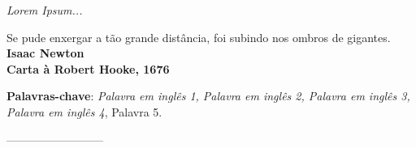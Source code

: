 
\newpage
\vspace*{\fill}
\begin{flushright}
		\textit{Lorem Ipsum...}
\end{flushright}

\begin{agradecimentos}

\lipsum[2-4]

\end{agradecimentos}

\begin{epigrafe}
    \vspace*{\fill}
	\begin{flushright}
		Se pude enxergar a tão grande distância, foi subindo nos ombros de gigantes.\\
		 \vspace{\baselineskip}
		\textbf{Isaac Newton}\\
		\textbf{Carta à Robert Hooke, 1676}
	\end{flushright}
\end{epigrafe}



\setlength{\absparsep}{18pt} %
\begin{resumo}

\lipsum[1-2]

 \textbf{Palavras-chave}: \textit{Palavra em inglês 1, Palavra em inglês 2, Palavra em inglês 3, Palavra em inglês 4}, Palavra 5.

\end{resumo}
\newpage

\newpage
--------------------------\newpage

